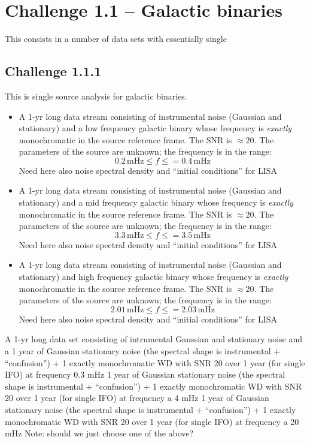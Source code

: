 \documentclass[11pt]{report}
\def\be{\begin{equation}}
\def\ee{\end{equation}}
\begin{document}
\begin{description}
\end{description}

\section{Challenge 1.1 -- Galactic binaries}

This consists in a number of data sets with essentially single 


\subsection{Challenge 1.1.1}

This is single source analysis for galactic binaries. 

\begin{itemize}
\item A 1-yr long data stream consisting of instrumental noise (Gaussian and stationary) and a low frequency galactic binary whose frequency is {\em exactly} monochromatic in the source reference frame. The SNR is $\approx 20$. The parameters of the source are unknown; the frequency is in the range:
\be
0.2\,\mathrm{mHz} \le f \le = 0.4\,\mathrm{mHz}
\ee
Need here also noise spectral density and ``initial conditions'' for LISA

\item A 1-yr long data stream consisting of instrumental noise (Gaussian and stationary) and a mid frequency galactic binary whose frequency is {\em exactly} monochromatic in the source reference frame. The SNR is $\approx 20$. The parameters of the source are unknown; the frequency is in the range:
\be
3.3\,\mathrm{mHz} \le f \le = 3.5\,\mathrm{mHz}
\ee
Need here also noise spectral density and ``initial conditions'' for LISA

\item A 1-yr long data stream consisting of instrumental noise (Gaussian and stationary) and high frequency galactic binary whose frequency is {\em exactly} monochromatic in the source reference frame. The SNR is $\approx 20$. The parameters of the source are unknown; the frequency is in the range:
\be
2.01\,\mathrm{mHz} \le f \le = 2.03\,\mathrm{mHz}
\ee
Need here also noise spectral density and ``initial conditions'' for LISA

\end{itemize}

A 1-yr long data set consisting of intrumental Gaussian and stationary noise and a 1 year of Gaussian stationary noise (the spectral shape is instrumental + “confusion”) + 1 exactly monochromatic WD with SNR 20 over 1 year (for single IFO) at frequency 0.3 mHz 
1 year of Gaussian stationary noise (the spectral shape is instrumental + “confusion”) + 1 exactly monochromatic WD with SNR 20 over 1 year (for single IFO) at frequency a 4 mHz 
1 year of Gaussian stationary noise (the spectral shape is instrumental + “confusion”) + 1 exactly monochromatic WD with SNR 20 over 1 year (for single IFO) at frequency a 20 mHz 
Note: should we just choose one of the above?
\end{document}

